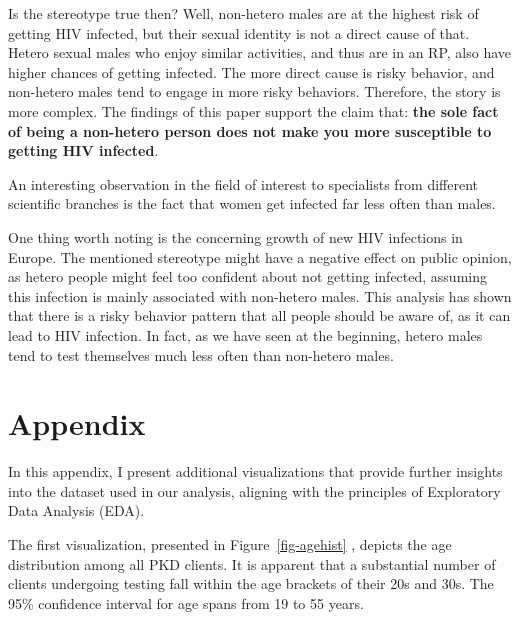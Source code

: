 \documentclass[
  12pt,
  letterpaper,
  DIV=11,
  numbers=noendperiod]{scrartcl}
\begin{document}
Is the stereotype true then? Well, non-hetero males are at the highest
risk of getting HIV infected, but their sexual identity is not a direct
cause of that. Hetero sexual males who enjoy similar activities, and
thus are in an RP, also have higher chances of getting infected. The
more direct cause is risky behavior, and non-hetero males tend to engage
in more risky behaviors. Therefore, the story is more complex. The
findings of this paper support the claim that:
\textbf{the sole fact of being a non-hetero person does not make you more susceptible to getting HIV infected}.

An interesting observation in the field of interest to specialists from
different scientific branches is the fact that women get infected far
less often than males.

One thing worth noting is the concerning growth of new HIV infections in
Europe. The mentioned stereotype might have a negative effect on public
opinion, as hetero people might feel too confident about not getting
infected, assuming this infection is mainly associated with non-hetero
males. This analysis has shown that there is a risky behavior pattern
that all people should be aware of, as it can lead to HIV infection. In
fact, as we have seen at the beginning, hetero males tend to test
themselves much less often than non-hetero males.

\hypertarget{appendix}{%
\section{Appendix}\label{appendix}}

In this appendix, I present additional visualizations that provide
further insights into the dataset used in our analysis, aligning with
the principles of Exploratory Data Analysis (EDA).

The first visualization, presented in Figure~\ref{fig-agehist} , depicts
the age distribution among all PKD clients. It is apparent that a
substantial number of clients undergoing testing fall within the age
brackets of their 20s and 30s. The 95\% confidence interval for age
spans from 19 to 55 years.
\end{document}

